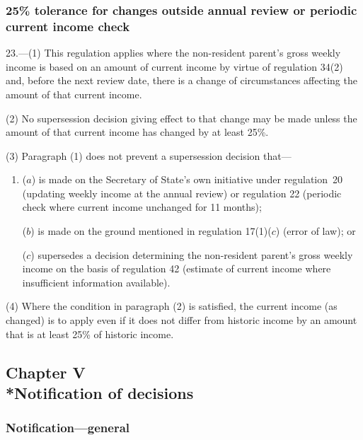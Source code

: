 \documentclass[12pt,a4paper]{article}
\begin{document}
\subsubsection[23. 25\% tolerance for changes outside annual review or periodic current income check]{25\% tolerance for changes outside annual review or periodic current income check}

23.---(1)  This regulation applies where the non-resident parent’s gross weekly income is based on an amount of current income by virtue of regulation 34(2) and, before the next review date, there is a change of circumstances affecting the amount of that current income.

(2) No supersession decision giving effect to that change may be made unless the amount of that current income has changed by at least 25\%.

(3) Paragraph (1) does not prevent a supersession decision that—
\begin{enumerate}\item[]
($a$) is made on the Secretary of State’s own initiative under regulation~20 (updating weekly income at the annual review) or regulation 22 (periodic check where current income unchanged for 11 months);

($b$) is made on the ground mentioned in regulation 17(1)($c$)  (error of law); or

($c$) supersedes a decision determining the non-resident parent’s gross weekly income on the basis of regulation 42 (estimate of current income where insufficient information available).
\end{enumerate}

(4) Where the condition in paragraph (2) is satisfied, the current income (as changed) is to apply even if it does not differ from historic income by an amount that is at least 25\% of historic income.

\subsection[Chapter V --- Notification of decisions]{Chapter V\\*Notification of decisions}

\renewcommand\parthead{--- Part III Chapter V}

\subsubsection[24. Notification---general]{Notification---general}
\end{document}
